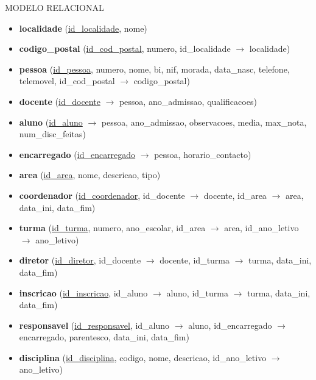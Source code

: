 \documentclass[12pt,a4paper,reqno]{report}
\numberwithin{figure}{section}
\numberwithin{equation}{section}
\begin{document}
MODELO RELACIONAL

\begin{itemize}

\item \textbf{localidade} (\underline{id\_localidade}, nome)

\item \textbf{codigo\_postal} (\underline {id\_cod\_postal}, numero, id\_localidade $\rightarrow$ localidade)

\item \textbf{pessoa} (\underline{id\_pessoa}, numero, nome, bi, nif, morada, data\_nasc, telefone, telemovel, id\_cod\_postal $\rightarrow$ codigo\_postal)

\item \textbf{docente} (\underline{id\_docente} $\rightarrow$ pessoa, ano\_admissao, qualificacoes)

\item \textbf{aluno} (\underline{id\_aluno} $\rightarrow$ pessoa, ano\_admissao, observacoes, media, max\_nota, num\_disc\_feitas)

\item \textbf{encarregado} (\underline{id\_encarregado} $\rightarrow$ pessoa, horario\_contacto)

\item \textbf{area} (\underline{id\_area}, nome, descricao, tipo)

\item \textbf{coordenador} (\underline{id\_coordenador}, id\_docente $\rightarrow$ docente, id\_area $\rightarrow$ area, data\_ini, data\_fim)

\item \textbf{turma} (\underline{id\_turma}, numero, ano\_escolar, id\_area $\rightarrow$ area, id\_ano\_letivo $\rightarrow$ ano\_letivo)

\item \textbf{diretor} (\underline{id\_diretor}, id\_docente $\rightarrow$ docente, id\_turma $\rightarrow$ turma, data\_ini, data\_fim)

\item \textbf{inscricao} (\underline{id\_inscricao}, id\_aluno $\rightarrow$ aluno, id\_turma $\rightarrow$ turma, data\_ini, data\_fim)

\item \textbf{responsavel} (\underline{id\_responsavel}, id\_aluno $\rightarrow$ aluno, id\_encarregado $\rightarrow$ encarregado, parentesco, data\_ini, data\_fim)

\item \textbf{disciplina} (\underline{id\_disciplina}, codigo, nome, descricao, id\_ano\_letivo $\rightarrow$ ano\_letivo)


\end{itemize}
\end{document}

